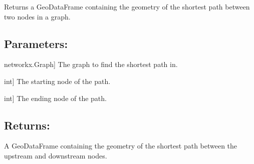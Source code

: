 \documentclass[letterpaper,10pt,english]{sphinxmanual}
\begin{document}
\begin{fulllineitems}
\label{\detokenize{pysewer:pysewer.helper.get_path_gdf}}
\pysigstartsignatures
{}
\pysigstopsignatures
\sphinxAtStartPar
Returns a GeoDataFrame containing the geometry of the shortest path between two nodes in a graph.


\subsection{Parameters:}
\label{\detokenize{pysewer:id7}}\begin{description}
\sphinxlineitem{G}{[}networkx.Graph{]}
\sphinxAtStartPar
The graph to find the shortest path in.

\sphinxlineitem{upstream}{[}int{]}
\sphinxAtStartPar
The starting node of the path.

\sphinxlineitem{downstream}{[}int{]}
\sphinxAtStartPar
The ending node of the path.

\end{description}


\subsection{Returns:}
\label{\detokenize{pysewer:id8}}\begin{description}
\sphinxAtStartPar
A GeoDataFrame containing the geometry of the shortest path between the upstream and downstream nodes.

\end{description}

\end{fulllineitems}

\end{document}
